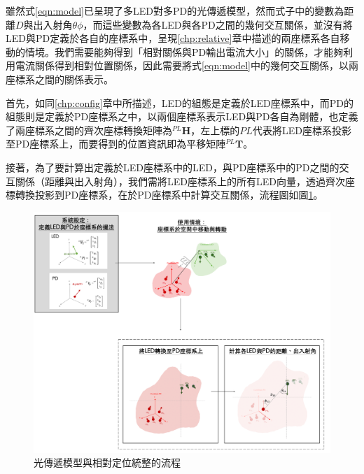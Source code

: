     雖然式\ref{eqn:model}已呈現了多LED對多PD的光傳遞模型，然而式子中的變數為距離$D$與出入射角$\theta\phi$，而這些變數為各LED與各PD之間的幾何交互關係，並沒有將LED與PD定義於各自的座標系中，呈現\ref{chp:relative}章中描述的兩座標系各自移動的情境。我們需要能夠得到「相對關係與PD輸出電流大小」的關係，才能夠利用電流關係得到相對位置關係，因此需要將式\ref{eqn:model}中的幾何交互關係，以兩座標系之間的關係表示。

    首先，如同\ref{chp:config}章中所描述，LED的組態是定義於LED座標系中，而PD的組態則是定義於PD座標系之中，以兩個座標系表示LED與PD各自為剛體，也定義了兩座標系之間的齊次座標轉換矩陣為$^{PL}\boldsymbol{H}$，左上標的$PL$代表將LED座標系投影至PD座標系上，而要得到的位置資訊即為平移矩陣$^{PL}\boldsymbol{T}$。

    接著，為了要計算出定義於LED座標系中的LED，與PD座標系中的PD之間的交互關係（距離與出入射角），我們需將LED座標系上的所有LED向量，透過齊次座標轉換投影到PD座標系，在於PD座標系中計算交互關係，流程圖如圖\ref{pic:model_transform_flow}。
    

    \begin{figure}[ht]
        \centering
        \includegraphics[width=15cm]{ch2pic/model_transform_flow.png}
        \caption{光傳遞模型與相對定位統整的流程}
        \label{pic:model_transform_flow}
    \end{figure}
    
